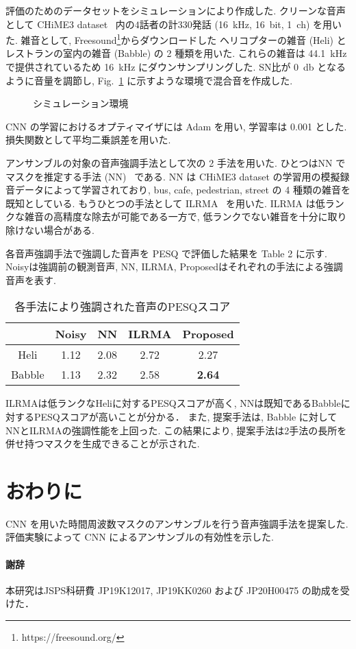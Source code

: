 \documentclass[a4j,10pt,uplatex]{jsarticle}
\begin{document}
評価のためのデータセットをシミュレーションにより作成した.
クリーンな音声として CHiME3 dataset~\cite{barker2015third} 内の$4$話者の計$330$発話
(\qty{16}{\kilo\hertz}, \qty{16}{bit}, \qty{1}{ch}) を用いた.
雑音として, Freesound\footnote{https://freesound.org/}からダウンロードした
ヘリコプターの雑音 (Heli) とレストランの室内の雑音 (Babble) の 2 種類を用いた.
これらの雑音は \qty{44.1}{\kilo\hertz} で提供されているため
\qty{16}{\kilo\hertz} にダウンサンプリングした.
SN比が \qty{0}{\decibel} となるように音量を調節し,
Fig.~\ref{environment} に示すような環境で混合音を作成した.
\begin{figure}[t]
 \centering
 \caption{シミュレーション環境} 
 \label{environment}
\end{figure}
CNN の学習におけるオプティマイザには Adam を用い, 学習率は 0.001 とした.
損失関数として平均二乗誤差を用いた.

アンサンブルの対象の音声強調手法として次の 2 手法を用いた.
ひとつはNN でマスクを推定する手法 (NN)~\cite{Hey2016} である.
NN は CHiME3 dataset の学習用の模擬録音データによって学習されており, 
bus, cafe, pedestrian, street の 4 種類の雑音を既知としている.
もうひとつの手法として ILRMA~\cite{kitamura2016determined} を用いた.
ILRMA は低ランクな雑音の高精度な除去が可能である一方で, 
低ランクでない雑音を十分に取り除けない場合がある.

各音声強調手法で強調した音声を PESQ で評価した結果を Table 2 に示す.
Noisyは強調前の観測音声, NN, ILRMA, Proposedはそれぞれの手法による強調音声を表す. 
\begin{table}[t]
\caption{各手法により強調された音声のPESQスコア}
\begin{tabular}{c|c|c|c|c}
             & Noisy & NN   & ILRMA & Proposed      \\ \hline
Heli    & 1.12  & 2.08 & 2.72  & 2.27          \\ \hline
Babble  & 1.13  & 2.32 & 2.58  & \textbf{2.64} %
\end{tabular}
\end{table}
ILRMAは低ランクなHeliに対するPESQスコアが高く,
NNは既知であるBabbleに対するPESQスコアが高いことが分かる．
また, 提案手法は, Babble に対してNNとILRMAの強調性能を上回った.
この結果により, 提案手法は2手法の長所を併せ持つマスクを生成できることが示された. 

\section{おわりに}
CNN を用いた時間周波数マスクのアンサンブルを行う音声強調手法を提案した.
評価実験によって CNN によるアンサンブルの有効性を示した.

\paragraph{謝辞}
本研究はJSPS科研費 JP19K12017, JP19KK0260 および JP20H00475 の助成を受けた．

\footnotesize
   
\end{document}
